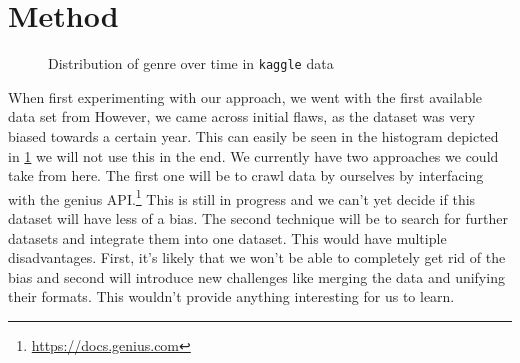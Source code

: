 \documentclass[11pt,a4paper]{article}
\begin{document}
\section{Method}
\begin{figure}[h]
	\centering
	\caption{Distribution of genre over time in \texttt{kaggle} data}
       \label{fig:kaggle}
\end{figure}
When first experimenting with our approach, we went with the first available data set from %
However, we came across initial flaws, as the dataset was very biased towards a certain year. This can easily be seen in the histogram depicted in \cref{fig:kaggle} we will not use this in the end. We currently have two approaches we could take from here. The first one will be to crawl data by ourselves by interfacing with the genius API.\footnote{\url{https://docs.genius.com}}
This is still in progress and we can't yet decide if this dataset will have less of a bias. The second technique will be to search for further datasets and integrate them into one dataset. This would have multiple disadvantages. First, it's likely that we won't be able to completely get rid of the bias and second will introduce new challenges like merging the data and unifying their formats. This wouldn't provide anything interesting for us to learn. 
\end{document}
